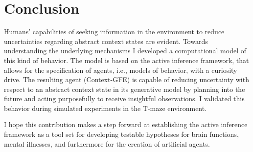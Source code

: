 \chapter{Conclusion}
\label{conclusion}

Humans' capabilities of seeking information in the environment to reduce uncertainties regarding abstract context states are evident. Towards understanding the underlying mechanisms I developed a computational model of this kind of behavior. The model is based on the active inference framework, that allows for the specification of agents, i.e., models of behavior, with a curiosity drive. The resulting agent (Context-GFE) is capable of reducing uncertainty with respect to an abstract context state in its generative model by planning into the future and acting purposefully to receive insightful observations. I validated this behavior during simulated experiments in the T-maze environment.

I hope this contribution makes a step forward at establishing the active inference framework as a tool set for developing testable hypotheses for brain functions, mental illnesses, and furthermore for the creation of artificial agents.